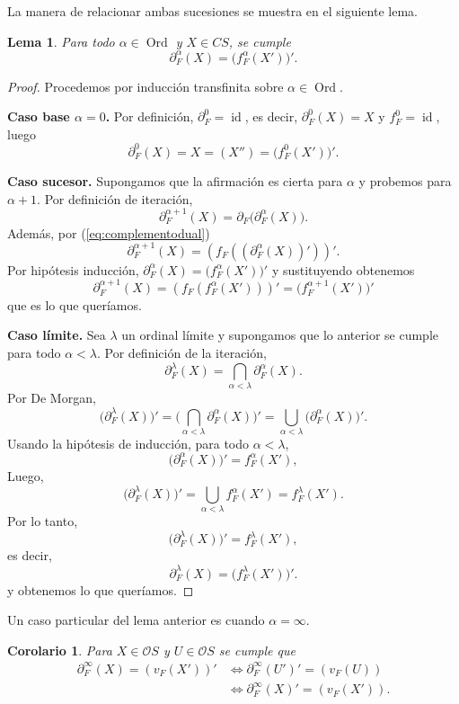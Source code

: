 \documentclass[11pt]{amsart}
\DeclareMathOperator{\id}{id}
\DeclareMathOperator{\Ord}{Ord}
\theoremstyle{plain}
\newtheorem{cor}[thm]{Corolario}
\newtheorem{lem}[thm]{Lema}
\theoremstyle{definition}
\begin{document}
La manera de relacionar ambas sucesiones se muestra en el siguiente lema.

\begin{lem}\label{inducciontransfinita}
Para todo $\alpha\in \Ord$ y $X\in CS$, se cumple
\begin{equation}\label{eq:induccion}
\partial_F^\alpha(X)=\big(f_F^\alpha(X')\big)'.
\end{equation}
\end{lem}

\begin{proof}
Procedemos por inducción transfinita sobre $\alpha\in \Ord$.

\smallskip
\noindent\textbf{Caso base $\alpha=0$.}
Por definición, $\partial_F^0=\id$, es decir, $\partial_F^0(X)=X$ y $f_F^0=\id$, luego
\[
\partial_F^0(X)=X=(X'')=\big(f_F^0(X')\big)'.
\]

\smallskip
\noindent\textbf{Caso sucesor.}
Supongamos que la afirmación es cierta para $\alpha$ y probemos para $\alpha+1$.
Por definición de iteración,
\[
\partial_F^{\alpha+1}(X)=\partial_F\big(\partial_F^\alpha(X)\big).
\]
Además, por (\ref{eq:complementodual})
\[
\partial_F^{\alpha+1}(X)
=(f_F((\partial_F^\alpha(X))'))'.
\]
Por hipótesis inducción, $\partial_F^\alpha(X)=\big(f_F^\alpha(X')\big)'$ y sustituyendo obtenemos
\[
\partial_F^{\alpha+1}(X)=(f_F(f_F^\alpha(X')))'=\big(f_F^{\alpha+1}(X')\big)'
\]
que es lo que queríamos.

\smallskip
\noindent\textbf{Caso límite.}
Sea $\lambda$ un ordinal límite y supongamos que lo anterior se cumple para todo $\alpha<\lambda$.
Por definición de la iteración,
\[
\partial_F^\lambda(X)=\bigcap_{\alpha<\lambda}\partial_F^\alpha(X).
\]
Por De Morgan,
\[
\big(\partial_F^\lambda(X)\big)'
=\Big(\bigcap_{\alpha<\lambda}\partial_F^\alpha(X)\Big)'
=\bigcup_{\alpha<\lambda}\big(\partial_F^\alpha(X)\big)'.
\]
Usando la hipótesis de inducción, para todo $\alpha<\lambda$,
\[
\big(\partial_F^\alpha(X)\big)'=f_F^\alpha(X'),
\]
Luego,
\[
\big(\partial_F^\lambda(X)\big)'=\bigcup_{\alpha<\lambda} f_F^\alpha(X')=f_F^\lambda(X').
\]
Por lo tanto,
\[
\big(\partial_F^\lambda(X)\big)'=f_F^\lambda(X'),
\]
es decir,
\[
\partial_F^\lambda(X)=\big(f_F^\lambda(X')\big)'.
\]
y obtenemos lo que queríamos.
\end{proof}

Un caso particular del lema anterior es cuando $\alpha=\infty$.
\begin{cor}\label{cor:infinito}
Para $X\in \mathcal{O}S$ y $U\in \mathcal{O}S$ se cumple que
\begin{equation}\label{eq:infinito}
    \begin{split}
\partial_F^\infty(X)=(v_F(X'))' & \iff \partial_F^\infty(U')'=(v_F(U))\\
& \iff \partial_F^\infty(X)'=(v_F(X')).
    \end{split}
\end{equation}
\end{cor}
\end{document}
